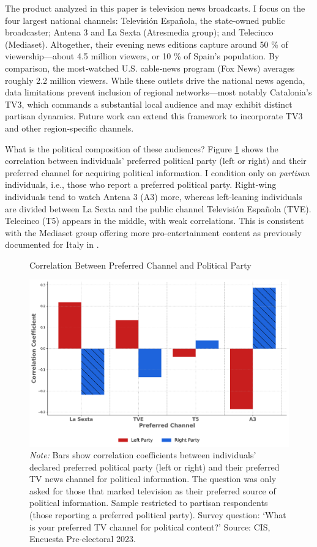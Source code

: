 \documentclass[12pt]{article}
\begin{document}
	
	The product analyzed in this paper is television news broadcasts. I focus on the four largest national channels: Televisión Española, the state‐owned public broadcaster; Antena 3 and La Sexta (Atresmedia group); and Telecinco (Mediaset). Altogether, their evening news editions capture around 50 \% of viewership—about 4.5 million viewers, or 10 \% of Spain’s population. By comparison, the most‐watched U.S. cable‐news program (Fox News) averages roughly 2.2 million  viewers. While these outlets drive the national news agenda, data limitations prevent inclusion of regional networks—most notably Catalonia’s TV3, which commands a substantial local audience and may exhibit distinct partisan dynamics. Future work can extend this framework to incorporate TV3 and other region‐specific channels.  
	
	
	
	What is the political composition of these audiences? Figure \ref{fig:opinion} shows the correlation between individuals' preferred political party (left or right) and their preferred channel for acquiring political information. I condition only on \textit{partisan} individuals, i.e., those who report a preferred political party. Right-wing individuals  tend to watch Antena 3 (A3) more, whereas left-leaning individuals are divided between La Sexta and the public channel Televisión Española (TVE). Telecinco (T5)  appears in the middle, with weak correlations. This is consistent with the Mediaset group offering more pro-entertainment content as previously documented for Italy in \citet{durante_aer}.
	
	
	\begin{figure}[!htbp]
		\centering
		\caption{Correlation Between Preferred Channel and Political Party}
		\includegraphics[width=120mm]{figures/corr_party_channel3}
		\caption*{\small \textit{Note:} Bars show correlation coefficients between individuals’ declared preferred political party (left or right) and their preferred TV news channel for political information. The question was only asked for those that marked television as their preferred source of political information. Sample restricted to partisan respondents (those reporting a preferred political party). Survey question: ‘What is your preferred TV channel for political content?’ Source: CIS, Encuesta Pre-electoral 2023.}
		\label{fig:opinion}
	\end{figure}
	
\end{document}
